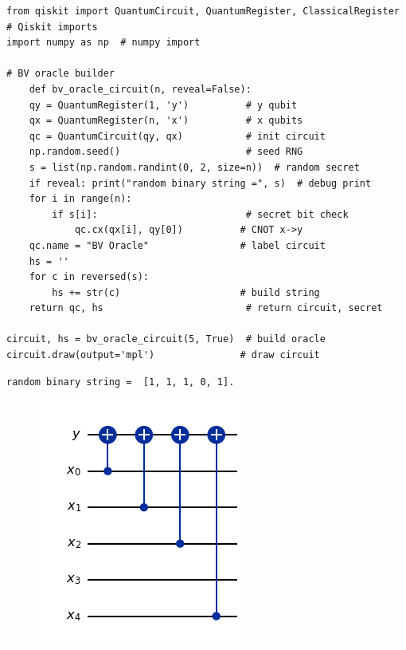 \newpage
\begin{lstlisting}[style=python]
from qiskit import QuantumCircuit, QuantumRegister, ClassicalRegister  # Qiskit imports
import numpy as np  # numpy import

# BV oracle builder
	def bv_oracle_circuit(n, reveal=False):
	qy = QuantumRegister(1, 'y')          # y qubit
	qx = QuantumRegister(n, 'x')          # x qubits
	qc = QuantumCircuit(qy, qx)           # init circuit
	np.random.seed()                      # seed RNG
	s = list(np.random.randint(0, 2, size=n))  # random secret
	if reveal: print("random binary string =", s)  # debug print
	for i in range(n):
		if s[i]:                          # secret bit check
			qc.cx(qx[i], qy[0])          # CNOT x->y
	qc.name = "BV Oracle"                # label circuit
	hs = ''
	for c in reversed(s):
		hs += str(c)                     # build string
	return qc, hs                         # return circuit, secret

circuit, hs = bv_oracle_circuit(5, True)  # build oracle
circuit.draw(output='mpl')               # draw circuit

\end{lstlisting}
\begin{lstlisting}
random binary string =  [1, 1, 1, 0, 1].
\end{lstlisting}

\begin{figure}[h!]\centering
	\includegraphics[scale=.5]{images/lab05_1}
\end{figure}

